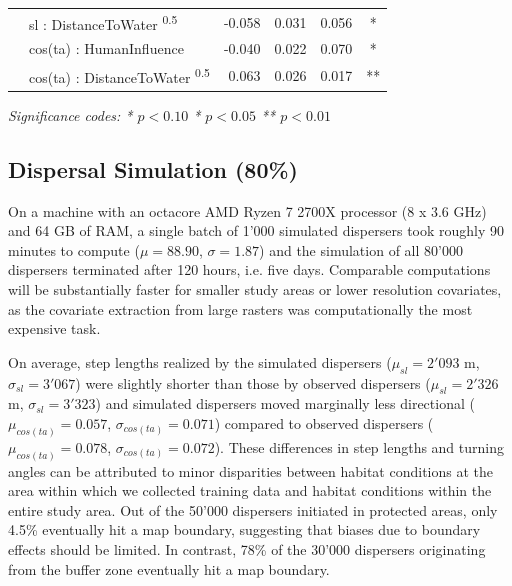 \documentclass[abstract=on,10pt,a4paper,bibliography=totocnumbered]{article}
\begin{document}
\begin{table}
\begin{center}
{\begin{threeparttable}
\begin{tabular}{llrrrc}
         & sl : DistanceToWater \textsuperscript{0.5} & -0.058 & 0.031 & 0.056 & * \\
         & cos(ta) : HumanInfluence & -0.040 & 0.022 & 0.070 & * \\
         & cos(ta) : DistanceToWater \textsuperscript{0.5} & 0.063 & 0.026 & 0.017 & ** \\
         \bottomrule
      \end{tabular}
       \begin{tablenotes}
         \item \textit{Significance codes: * \(p < 0.10\) \quad ** \(p < 0.05\)
         \quad *** \(p < 0.01\)}
       \end{tablenotes}
    \end{threeparttable}
    }
  \end{center}
\end{table}

\subsection{Dispersal Simulation (80\%)}
On a machine with an octacore AMD Ryzen 7 2700X processor (8 x 3.6 GHz) and 64
GB of RAM, a single batch of 1'000 simulated dispersers took roughly 90 minutes
to compute (\(\mu = 88.90\), \(\sigma = 1.87\)) and the simulation of all 80'000
dispersers terminated after 120 hours, i.e. five days. Comparable computations
will be substantially faster for smaller study areas or lower resolution
covariates, as the covariate extraction from large rasters was computationally
the most expensive task.

On average, step lengths realized by the simulated dispersers (\(\mu_{sl} =
2'093\) m, \(\sigma_{sl} = 3'067\)) were slightly shorter than those by observed
dispersers (\(\mu_{sl} = 2'326\) m, \(\sigma_{sl} = 3'323\)) and simulated
dispersers moved marginally less directional (\(\mu_{cos(ta)} = 0.057\),
\(\sigma_{cos(ta)} = 0.071\)) compared to observed dispersers (\(\mu_{cos(ta)} =
0.078\), \(\sigma_{cos(ta)} = 0.072\)). These differences in step lengths and
turning angles can be attributed to minor disparities between habitat conditions
at the area within which we collected training data and habitat conditions
within the entire study area. Out of the 50'000 dispersers initiated in
protected areas, only 4.5\% eventually hit a map boundary, suggesting that
biases due to boundary effects should be limited. In contrast, 78\% of the
30'000 dispersers originating from the buffer zone eventually hit a map
boundary.
\end{document}
